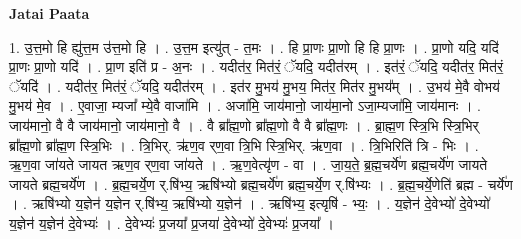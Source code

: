 \documentclass[17pt]{extarticle}
\begin{document}
\textbf{Jatai Paata} \newline

1. उ॒त्त॒मो हि ह्यु॑त्त॒म उ॑त्त॒मो हि । . उ॒त्त॒म इत्यु॑त् - त॒मः । . हि प्रा॒णः प्रा॒णो हि हि प्रा॒णः । . प्रा॒णो यदि॒ यदि॑ प्रा॒णः प्रा॒णो यदि॑ । . प्रा॒ण इति॑ प्र - अ॒नः । . यदीत॑र॒ मित॑रं॒ ॅयदि॒ यदीत॑रम् । . इत॑रं॒ ॅयदि॒ यदीत॑र॒ मित॑रं॒ ॅयदि॑ । . यदीत॑र॒ मित॑रं॒ ॅयदि॒ यदीत॑रम् । . इत॑र मु॒भय॑ मु॒भय॒ मित॑र॒ मित॑र मु॒भय᳚म् । . उ॒भय॑ मे॒वै वोभय॑ मु॒भय॑ मे॒व । . ए॒वाजा॒ म्यजा᳚ म्ये॒वै वाजा॑मि । . अजा॑मि॒ जाय॑मानो॒ जाय॑मा॒नो ऽजा॒म्यजा॑मि॒ जाय॑मानः । . जाय॑मानो॒ वै वै जाय॑मानो॒ जाय॑मानो॒ वै । . वै ब्रा᳚ह्म॒णो ब्रा᳚ह्म॒णो वै वै ब्रा᳚ह्म॒णः । . ब्रा॒ह्म॒ण स्त्रि॒भि स्त्रि॒भिर् ब्रा᳚ह्म॒णो ब्रा᳚ह्म॒ण स्त्रि॒भिः । . त्रि॒भिर्. ऋ॑ण॒व र्‌ण॒वा त्रि॒भि स्त्रि॒भिर्. ऋ॑ण॒वा । . त्रि॒भिरिति॑ त्रि - भिः । . ऋ॒ण॒वा जा॑यते जायत ऋण॒व र्‌ण॒वा जा॑यते । . ऋ॒ण॒वेत्यृ॑ण - वा । . जा॒य॒ते॒ ब्र॒ह्म॒चर्ये॑ण ब्रह्म॒चर्ये॑ण जायते जायते ब्रह्म॒चर्ये॑ण । . ब्र॒ह्म॒चर्ये॒ण र्.षि॑भ्य॒ ऋषि॑भ्यो ब्रह्म॒चर्ये॑ण ब्रह्म॒चर्ये॒ण र्.षि॑भ्यः । . ब्र॒ह्म॒चर्ये॒णेति॑ ब्रह्म - चर्ये॑ण । . ऋषि॑भ्यो य॒ज्ञेन॑ य॒ज्ञेन र्.षि॑भ्य॒ ऋषि॑भ्यो य॒ज्ञेन॑ । . ऋषि॑भ्य॒ इत्यृषि॑ - भ्यः॒ । . य॒ज्ञेन॑ दे॒वेभ्यो॑ दे॒वेभ्यो॑ य॒ज्ञेन॑ य॒ज्ञेन॑ दे॒वेभ्यः॑ । . दे॒वेभ्यः॑ प्र॒जया᳚ प्र॒जया॑ दे॒वेभ्यो॑ दे॒वेभ्यः॑ प्र॒जया᳚ । \newline
\end{document}
